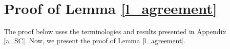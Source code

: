 \documentclass[letterpaper, 11pt]{article}
\newcommand{\comment}[1]{}
\newcommand{\fillbox}{\hspace*{\fill}}
\begin{document}
\fillbox


~

\comment{++++++
Consider nodes in set . As shown in Corollary \ref{cor:2f+1} in Section \ref{nec_2},
when , each node in  has at least  incoming neighbors.
Since ,
for each  there must exist at least
 incoming neighbors in . 
Thus, the desired set  exists, satisfying
the requirement in step (j) of Algorithm BC.

+++++++++++++ f+1??? ++++++++++++}

\fillbox





\section{Proof of Lemma \ref{l_agreement}}
\label{a_l_agreement}

The proof below uses the terminologies and results presented in Appendix \ref{a_SC}. Now, we present the proof of Lemma \ref{l_agreement}.
\end{document}
